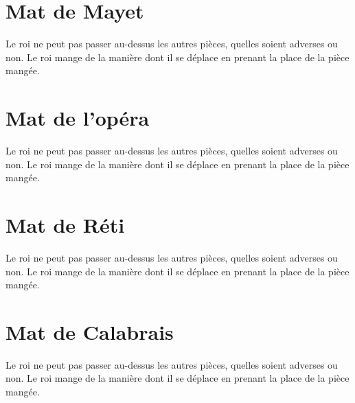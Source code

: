 \documentclass[a5paper,openany,twocolumn]{book}
\begin{document}
{%

\chapter{Mat de Mayet}

Le roi ne peut pas passer au-dessus les autres pièces, quelles soient adverses ou non. Le roi mange de la manière dont il se déplace en prenant la place de la pièce mangée. 

 
\chapter{Mat de l'opéra}

Le roi ne peut pas passer au-dessus les autres pièces, quelles soient adverses ou non. Le roi mange de la manière dont il se déplace en prenant la place de la pièce mangée. 


\chapter{Mat de Réti}

Le roi ne peut pas passer au-dessus les autres pièces, quelles soient adverses ou non. Le roi mange de la manière dont il se déplace en prenant la place de la pièce mangée. 

 
\chapter{Mat de Calabrais}

Le roi ne peut pas passer au-dessus les autres pièces, quelles soient adverses ou non. Le roi mange de la manière dont il se déplace en prenant la place de la pièce mangée. 


\onecolumn

}
\end{document}
